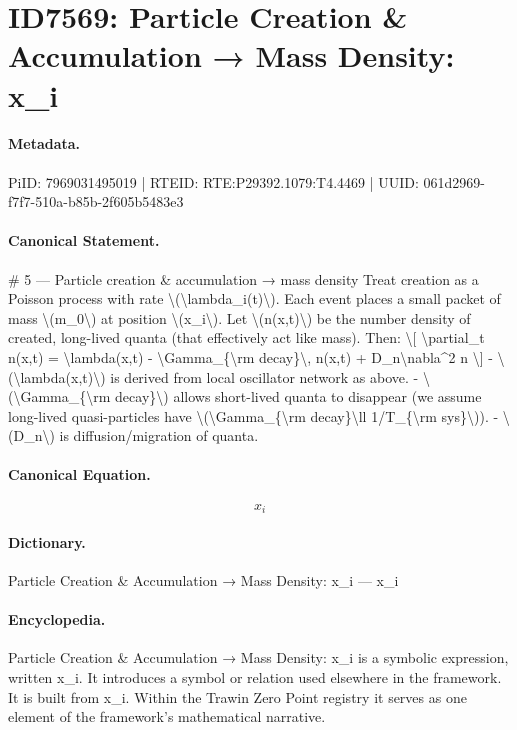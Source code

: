 \section*{ID7569: Particle Creation \& Accumulation → Mass Density: x\_i}
\paragraph{Metadata.}
PiID: 7969031495019 | RTEID: RTE:P29392.1079:T4.4469 | UUID: 061d2969-f7f7-510a-b85b-2f605b5483e3

\paragraph{Canonical Statement.}
\# 5 — Particle creation \& accumulation → mass density Treat creation as a Poisson process with rate \textbackslash{}(\textbackslash{}lambda\_i(t)\textbackslash{}). Each event places a small packet of mass \textbackslash{}(m\_0\textbackslash{}) at position \textbackslash{}(x\_i\textbackslash{}). Let \textbackslash{}(n(x,t)\textbackslash{}) be the number density of created, long-lived quanta (that effectively act like mass). Then: \textbackslash{}[ \textbackslash{}partial\_t n(x,t) = \textbackslash{}lambda(x,t) - \textbackslash{}Gamma\_\{\textbackslash{}rm decay\}\textbackslash{}, n(x,t) + D\_n\textbackslash{}nabla\textasciicircum{}2 n \textbackslash{}] - \textbackslash{}(\textbackslash{}lambda(x,t)\textbackslash{}) is derived from local oscillator network as above. - \textbackslash{}(\textbackslash{}Gamma\_\{\textbackslash{}rm decay\}\textbackslash{}) allows short-lived quanta to disappear (we assume long-lived quasi-particles have \textbackslash{}(\textbackslash{}Gamma\_\{\textbackslash{}rm decay\}\textbackslash{}ll 1/T\_\{\textbackslash{}rm sys\}\textbackslash{})). - \textbackslash{}(D\_n\textbackslash{}) is diffusion/migration of quanta.

\paragraph{Canonical Equation.}
\[
x_i
\]

\paragraph{Dictionary.}
Particle Creation \& Accumulation → Mass Density: x\_i — x\_i

\paragraph{Encyclopedia.}
Particle Creation \& Accumulation → Mass Density: x\_i is a symbolic expression, written x\_i. It introduces a symbol or relation used elsewhere in the framework. It is built from x\_i. Within the Trawin Zero Point registry it serves as one element of the framework's mathematical narrative.
